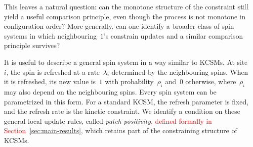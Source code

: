 This leaves a natural question: can the monotone structure of the constraint
still yield a useful comparison principle, even though the process is not
monotone in configuration order? More generally, can one identify a broader
class of spin systems in which neighbouring~$1$'s constrain updates and a similar comparison principle survives?


%
%
%

It is useful to describe a general spin system in a way similar to KCSMs. At
site~$i$, the spin is refreshed at a rate~$\lambda_i$ determined by the
neighbouring spins. When it is refreshed, its new value is~$1$ with
probability~$\rho_i$ and~$0$ otherwise, where~$\rho_i$ may also depend on the
neighbouring spins. Every spin system can be parametrized in this form. For a
standard KCSM, the refresh parameter is fixed, and the refresh rate is the
kinetic constraint. We identify a condition on these general local update
rules, called \emph{patch positivity}\textcolor{red}{, defined formally in
Section~\ref{sec:main-results}}, which retains part of the constraining
structure of KCSMs.



%
%
%


